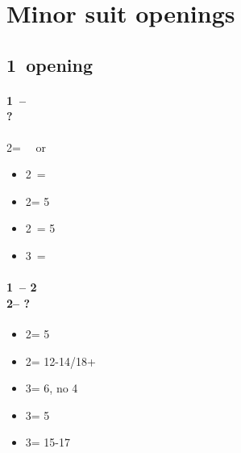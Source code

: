 \documentclass[12pt, a4paper]{report}
\begin{document}
\chapter*{\colorbox{Plum!30}{Minor suit openings}}

\section*{\colorbox{blue!30}{1\clubs\ opening}}
 {

    \subsubsection*{1\clubs\ -- \alrts{2\clubs} \\ ?}
    2\clubs = \gf\ \nat\ or \bal
    \begin{itemize}
        \item 2\diams\ = \bal
        \item 2\major = 5\major
        \item 2\nt\ = 5\diams
        \item 3\clubs\ = \clubs
    \end{itemize}

    \subsubsection*{1\clubs\ -- 2\clubs \\
                2\diams -- ?}
    \begin{itemize}
        \item 2\major = 5\major
        \item 2\nt = 12-14/18+ \bal
        \item 3\clubs = 6\clubs, no 4\major
        \item 3\diams = 5\diams
        \item 3\nt = 15-17 \bal
    \end{itemize}
}
\end{document}
